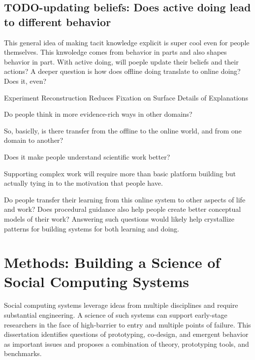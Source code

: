 \subsection{TODO-updating beliefs: Does active doing lead to different behavior}
This general idea of making tacit knowledge explicit is super cool even for people themselves. This knwoledge comes from behavior in parts and also shapes behavior in part. With active doing, will poeple update their beliefs and their actions? A deeper question is how does offline doing translate to online doing? Does it, even?

Experiment Reconstruction Reduces Fixation on Surface Details of Explanations

Do people think in more evidence-rich ways in other domains?

So, basiclly, is there transfer from the offline to the online world, and from one domain to another?

Does it make people understand scientific work better?

Supporting complex work will require more than basic platform building but actually tying in to the motivation that people have.

 Do people transfer their learning from this online system to other aspects of life and work? Does procedural guidance also help people create better conceptual models of their work? Answering such questions would likely help crystallize patterns for building systems for both learning and doing.


\section{Methods: Building a Science of Social Computing Systems}

Social computing systems leverage ideas from multiple disciplines and require substantial engineering. A science of such systems can support early-stage researchers in the face of high-barrier to entry and multiple points of failure. This dissertation identifies questions of prototyping, co-design, and emergent behavior as important issues and proposes a combination of theory, prototyping tools, and benchmarks. 

